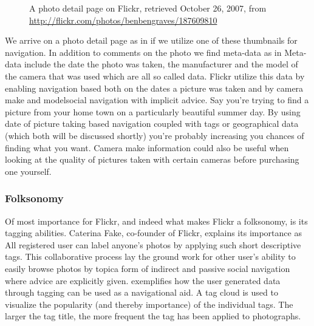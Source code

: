 \begin{figure}
\begin{whole}
\begin{minipage}[t]{0.475\wholewidth}
      \caption[Flickr Photo Detail Page]{%
         A photo detail page on Flickr,
         retrieved October 26, 2007, from
         \url{http://flickr.com/photos/benbengraves/187609810}}
      \label{figure:scrsh.flickr.photo.detail}
    \end{minipage}
  \end{whole}
  \normalcaption
\end{figure}

We arrive on a photo detail page  as in
if we utilize one of these thumbnails for navigation. In addition to comments
on the photo we find meta-data as in 
Meta-data include the date the photo was taken, the manufacturer and the model
of the camera that was used which are all so called %
data. Flickr utilize this data by enabling navigation based both on the
dates a picture was taken and by camera make and model\dash{}social navigation
with implicit advice. Say you're trying to
find a picture from your home town on a particularly beautiful summer day. By
using date of picture taking based navigation coupled with tags or
geographical data (which both will be discussed shortly) you're probably
increasing you chances of finding what you want. Camera make information could
also be useful when looking at the quality of pictures taken with certain
cameras before purchasing one yourself.


\subsubsection{Folksonomy}

Of most importance
for Flickr, and indeed what makes Flickr a folksonomy, is its tagging
abilities. Caterina Fake, co-founder of Flickr, explains its importance as
All registered user can label anyone's photos by applying such short
descriptive tags. This collaborative process lay the ground work for other
user's ability to easily browse photos by topic\dash{}a form of indirect and
passive social navigation where advice are explicitly given.
exemplifies how the user generated data through tagging 
can be used as a navigational aid. A tag cloud is used to visualize the
popularity (and thereby importance) of the individual tags. The larger the
tag title, the more frequent the tag has been applied to photographs.

